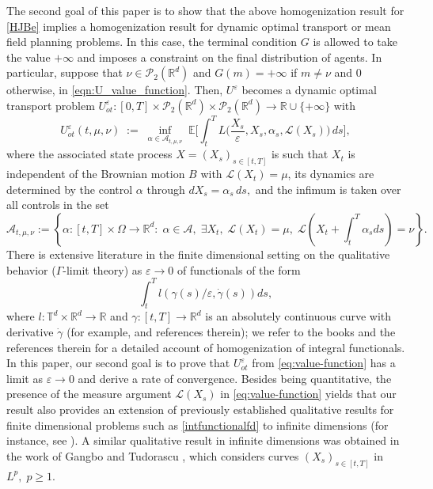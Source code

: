 \documentclass[reqno,11pt]{amsart}
\numberwithin{equation}{section}
\newcommand{\be}{\begin{equation}}
\newcommand{\ee}{\end{equation}}
\newcommand{\R}{\mathbb{R}} %
\newcommand{\e}{\varepsilon}
\newcommand{\T}{\mathbb{T}}
\newcommand{\nd}{\noindent}
\begin{document}
    \nd
    The second goal of this paper is to show that the above homogenization result for \eqref{HJBe} implies a homogenization result for dynamic optimal transport or mean field planning problems. In this case, the terminal condition $G$ is allowed to take the value $+\infty$ and imposes a constraint on the final distribution of agents. In particular, suppose that $\nu\in \mathcal{P}_2(\R^d)$ and $G(m)=+\infty$ if $m\neq \nu$ and $0$ otherwise, in \eqref{eqn:U_value_function}. Then, $U^\e$ becomes a dynamic optimal transport problem $U_{ot}^\e\colon[0,T]\times\mathcal{P}_2(\R^d)\times\mathcal{P}_2(\R^d)\to \R\cup\{+\infty\}$ with
     \begin{equation}\label{eq:value-function}
        U_{ot}^\varepsilon(t,\mu,\nu)
        \;:=\;
        \inf_{\alpha\in \mathcal{A}_{t,\mu,\nu}}\;
        \mathbb E\Bigg[\int_t^T L\Big(\frac{X_s}{\varepsilon},X_s,\alpha_s,\mathcal{L}(X_s)\Big)\,ds\Bigg],
    \end{equation}
    where the associated state process $X=(X_s)_{s\in [t,T]}$ is such that $X_t$ is independent of the Brownian motion $B$ with $\mathcal{L}(X_t)=\mu$, its dynamics are determined by the control $\alpha$ through $dX_s=\alpha_s\,ds,$ and the infimum is taken over all controls in the set
    \be\label{controlsetot}
    \mathcal{A}_{t,\mu,\nu}:=\left\{\alpha\colon[t,T]\times\Omega\to\R^d:\; \alpha\in\mathcal{A},\;\exists X_t,\;\mathcal{L}(X_t)=\mu,\;\mathcal{L}(X_t+\int_t^T\alpha_sds)=\nu\right\}.
    \ee
    There is extensive literature in the finite dimensional setting on the qualitative behavior ($\Gamma$-limit theory) as $\e\to 0$ of functionals of the form
    \be\label{intfunctionalfd}
    \int_t^Tl(\gamma(s)/\e,\dot{\gamma}(s))ds,
    \ee
    where $l\colon \T^d\times \R^d\to \R$ and $\gamma\colon[t,T]\to \R^d$ is an absolutely continuous curve with derivative $\dot{\gamma}$ (for example, \cite{Weinan1991} and references therein); we refer to the books \cite{braides1998homogenization, jikov2012homogenization} and the references therein for a detailed account of homogenization of integral functionals. In this paper, our second goal is to prove that $U^\e_{ot}$ from \eqref{eq:value-function} has a limit as $\e\to 0$ and derive a rate of convergence. Besides being quantitative, the presence of the measure argument $\mathcal{L}(X_s)$ in \eqref{eq:value-function} yields that our result also provides an extension of previously established qualitative results for finite dimensional problems such as \eqref{intfunctionalfd} to infinite dimensions (for instance, see \cite{capuzzo2001rate, TranYu2021}). A similar qualitative result in infinite dimensions was obtained in the work of Gangbo and Tudorascu \cite{GangboTudorascu2012}, which considers curves $(X_s)_{s\in [t,T]}$ in $L^p,\; p\ge 1$.
    \vspace{2mm}
\end{document}
